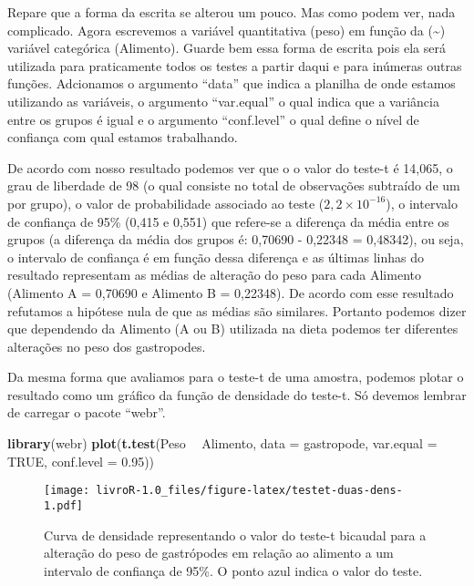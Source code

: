 \documentclass[]{book}
\newenvironment{Shaded}{\begin{snugshade}}{\end{snugshade}}
\newcommand{\DataTypeTok}[1]{\textcolor[rgb]{0.13,0.29,0.53}{#1}}
\newcommand{\FloatTok}[1]{\textcolor[rgb]{0.00,0.00,0.81}{#1}}
\newcommand{\KeywordTok}[1]{\textcolor[rgb]{0.13,0.29,0.53}{\textbf{#1}}}
\newcommand{\NormalTok}[1]{#1}
\newcommand{\OperatorTok}[1]{\textcolor[rgb]{0.81,0.36,0.00}{\textbf{#1}}}
\newcommand{\OtherTok}[1]{\textcolor[rgb]{0.56,0.35,0.01}{#1}}
\newcommand{\StringTok}[1]{\textcolor[rgb]{0.31,0.60,0.02}{#1}}
\begin{document}
Repare que a forma da escrita se alterou um pouco. Mas como podem ver, nada complicado. Agora escrevemos a variável quantitativa (peso) em função da (\textasciitilde{}) variável categórica (Alimento). Guarde bem essa forma de escrita pois ela será utilizada para praticamente todos os testes a partir daqui e para inúmeras outras funções. Adcionamos o argumento ``data'' que indica a planilha de onde estamos utilizando as variáveis, o argumento ``var.equal'' o qual indica que a variância entre os grupos é igual e o argumento ``conf.level'' o qual define o nível de confiança com qual estamos trabalhando.

De acordo com nosso resultado podemos ver que o o valor do teste-t é 14,065, o grau de liberdade de 98 (o qual consiste no total de observações subtraído de um por grupo), o valor de probabilidade associado ao teste (\(2,2\times10^{-16}\)), o intervalo de confiança de 95\% (0,415 e 0,551) que refere-se a diferença da média entre os grupos (a diferença da média dos grupos é: 0,70690 - 0,22348 = 0,48342), ou seja, o intervalo de confiança é em função dessa diferença e as últimas linhas do resultado representam as médias de alteração do peso para cada Alimento (Alimento A = 0,70690 e Alimento B = 0,22348). De acordo com esse resultado refutamos a hipótese nula de que as médias são similares. Portanto podemos dizer que dependendo da Alimento (A ou B) utilizada na dieta podemos ter diferentes alterações no peso dos gastropodes.

Da mesma forma que avaliamos para o teste-t de uma amostra, podemos plotar o resultado como um gráfico da função de densidade do teste-t. Só devemos lembrar de carregar o pacote ``webr''.

\begin{Shaded}
\begin{Highlighting}[]
\KeywordTok{library}\NormalTok{(webr)}
\KeywordTok{plot}\NormalTok{(}\KeywordTok{t.test}\NormalTok{(Peso }\OperatorTok{~}\StringTok{ }\NormalTok{Alimento, }
            \DataTypeTok{data =}\NormalTok{ gastropode,}
            \DataTypeTok{var.equal =} \OtherTok{TRUE}\NormalTok{,}
            \DataTypeTok{conf.level =} \FloatTok{0.95}\NormalTok{))}
\end{Highlighting}
\end{Shaded}

\begin{figure}
\centering
\texttt{[image: livroR-1.0\_files/figure-latex/testet-duas-dens-1.pdf]}
\caption{\label{fig:testet-duas-dens}Curva de densidade representando o valor do teste-t bicaudal para a alteração do peso de gastrópodes em relação ao alimento a um intervalo de confiança de 95\%. O ponto azul indica o valor do teste.}
\end{figure}
\end{document}
